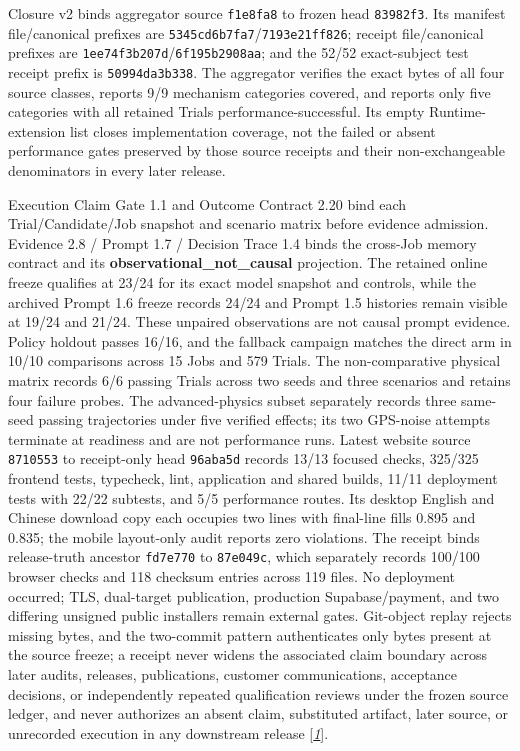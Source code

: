 Closure v2 binds aggregator source \texttt{f1e8fa8} to frozen head
\texttt{83982f3}. Its manifest file/canonical prefixes are
\texttt{5345cd6b7fa7}/\texttt{7193e21ff826}; receipt
file/canonical prefixes are
\texttt{1ee74f3b207d}/\texttt{6f195b2908aa}; and the 52/52
exact-subject test receipt prefix is \texttt{50994da3b338}. The
aggregator verifies the exact bytes of all four source classes, reports
9/9 mechanism categories covered, and reports only five categories with
all retained Trials performance-successful. Its empty Runtime-extension
list closes implementation coverage, not the failed or absent performance
gates preserved by those source receipts and their non-exchangeable
denominators in every later release.

Execution Claim Gate 1.1 and Outcome Contract 2.20 bind each
Trial/Candidate/Job snapshot and scenario matrix before evidence
admission. Evidence 2.8 / Prompt 1.7 / Decision Trace 1.4 binds the
cross-Job memory contract and its \textbf{observational\_not\_causal}
projection. The retained online freeze qualifies at 23/24 for its exact
model snapshot and controls, while the archived Prompt 1.6 freeze records
24/24 and Prompt 1.5 histories remain visible at 19/24 and 21/24. These
unpaired observations are not causal prompt evidence. Policy holdout passes 16/16,
and the fallback campaign matches the direct arm in 10/10 comparisons
across 15 Jobs and 579 Trials. The non-comparative physical matrix records
6/6 passing Trials across two seeds and three scenarios and retains four
failure probes. The advanced-physics subset separately records three
same-seed passing trajectories under five verified effects; its two
GPS-noise attempts terminate at readiness and are not performance runs.
Latest website source \texttt{8710553} to receipt-only head
\texttt{96aba5d} records 13/13 focused checks, 325/325 frontend tests,
typecheck, lint, application and shared builds, 11/11 deployment tests
with 22/22 subtests, and 5/5 performance routes. Its desktop English and
Chinese download copy each occupies two lines with final-line fills 0.895
and 0.835; the mobile layout-only audit reports zero violations. The
receipt binds release-truth ancestor \texttt{fd7e770} to
\texttt{87e049c}, which separately records 100/100 browser checks and 118
checksum entries across 119 files. No deployment occurred; TLS,
dual-target publication, production Supabase/payment, and two differing
unsigned public installers remain external gates. Git-object replay
rejects missing bytes, and the two-commit pattern authenticates only bytes
present at the source freeze; a receipt never widens the associated claim
boundary across later audits, releases, publications, customer
communications, acceptance decisions, or independently repeated
qualification reviews under the frozen source ledger, and never
authorizes an absent claim, substituted artifact, later source, or
unrecorded execution in any downstream release
{[}\protect\hyperlink{ref_1}{\emph{1}}{]}.

